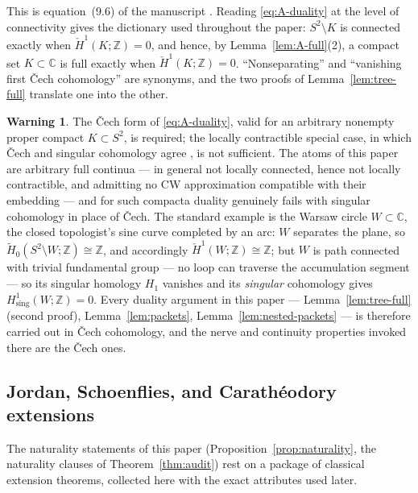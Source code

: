\documentclass[11pt,reqno]{amsart}
\theoremstyle{definition}
\newtheorem{warning}[theorem]{Warning}
\theoremstyle{remark}
\newcommand{\C}{\mathbb C}
\newcommand{\Z}{\mathbb Z}
\begin{document}
This is equation~(9.6) of the manuscript \cite{MWman}.  Reading
\eqref{eq:A-duality} at the level of connectivity gives the dictionary
used throughout the paper: $S^2\setminus K$ is connected exactly when
$\check H^1(K;\Z)=0$, and hence, by Lemma~\ref{lem:A-full}(2), a compact
set $K\subset\C$ is full exactly when $\check H^1(K;\Z)=0$.
``Nonseparating'' and ``vanishing first \v{C}ech cohomology'' are
synonyms, and the two proofs of Lemma~\ref{lem:tree-full} translate one
into the other.

\begin{warning}\label{warn:A-cech}
The \v{C}ech form of \eqref{eq:A-duality}, valid for an arbitrary
nonempty proper compact $K\subset S^2$, is required; the locally
contractible special case, in which \v{C}ech and singular cohomology
agree \cite{Hat02}, is not sufficient.  The atoms of this paper are
arbitrary full continua --- in general not locally connected, hence not
locally contractible, and admitting no CW approximation compatible with
their embedding --- and for such compacta duality genuinely fails with
singular cohomology in place of \v{C}ech.  The standard example is the
Warsaw circle $W\subset\C$, the closed topologist's sine curve completed
by an arc: $W$ separates the plane, so
$\widetilde H_0(S^2\setminus W;\Z)\cong\Z$, and accordingly
$\check H^1(W;\Z)\cong\Z$; but $W$ is path connected with trivial
fundamental group --- no loop can traverse the accumulation segment ---
so its singular homology $H_1$ vanishes and its \emph{singular}
cohomology gives $H^1_{\mathrm{sing}}(W;\Z)=0$.  Every duality argument in this paper ---
Lemma~\ref{lem:tree-full} (second proof), Lemma~\ref{lem:packets},
Lemma~\ref{lem:nested-packets} --- is therefore carried out in \v{C}ech
cohomology, and the nerve and continuity properties invoked there are the
\v{C}ech ones.
\end{warning}

\subsection{Jordan, Schoenflies, and Carath\'eodory extensions}
\label{subsec:A-extension}

The naturality statements of this paper
(Proposition~\ref{prop:naturality}, the naturality clauses of
Theorem~\ref{thm:audit}) rest on a package of classical extension
theorems, collected here with the exact attributes used later.
\end{document}
